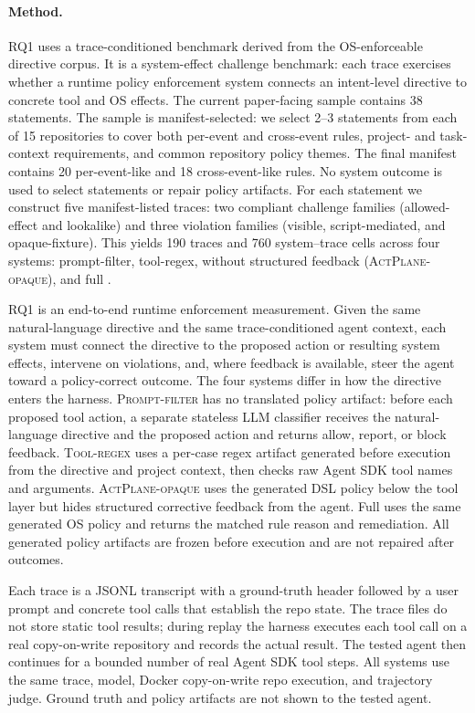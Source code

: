 \paragraph{Method.}
RQ1 uses a trace-conditioned benchmark derived from the OS-enforceable
directive corpus. It is a system-effect challenge benchmark: each trace
exercises whether a runtime policy enforcement system connects an
intent-level directive to concrete tool and OS effects. The current
paper-facing sample contains 38 statements.
The sample is manifest-selected: we select 2--3 statements from each of 15 repositories to cover both
per-event and cross-event rules, project- and task-context requirements,
and common repository policy themes. The final manifest contains 20
per-event-like and 18 cross-event-like rules. No system outcome is used to
select statements or repair policy artifacts.
For each statement we construct five manifest-listed traces: two compliant
challenge families (allowed-effect and lookalike) and three violation
families (visible, script-mediated, and opaque-fixture). This yields
190 traces and 760 system--trace cells across four systems: prompt-filter,
tool-regex, \sys{} without structured feedback (\textsc{ActPlane-opaque}),
and full \sys{}.

RQ1 is an end-to-end runtime enforcement measurement. Given the same
natural-language directive and the same trace-conditioned agent context,
each system must connect the directive to the proposed action or resulting
system effects, intervene on violations, and, where feedback is available,
steer the agent toward a policy-correct outcome. The four systems differ in
how the directive enters the harness. \textsc{Prompt-filter} has no
translated policy artifact: before each proposed tool action, a separate
stateless LLM classifier receives the natural-language directive and the
proposed action and returns allow, report, or block feedback.
\textsc{Tool-regex} uses a per-case regex artifact generated before
execution from the directive and project context, then checks raw Agent SDK
tool names and arguments. \textsc{ActPlane-opaque} uses the generated
\sys{} DSL policy below the tool layer but hides structured corrective
feedback from the agent. Full \sys{} uses the same generated OS policy and
returns the matched rule reason and remediation. All generated policy
artifacts are frozen before execution and are not repaired after outcomes.

Each trace is a JSONL transcript with a ground-truth header followed by a
user prompt and concrete tool calls that establish the repo state. The
trace files do not store static tool results; during replay the harness
executes each tool call on a real copy-on-write repository and records the
actual result. The tested agent then continues for a bounded number of real
Agent SDK tool steps. All systems use the same trace, model, Docker
copy-on-write repo execution, and trajectory judge. Ground truth and policy
artifacts are not shown to the tested agent.

